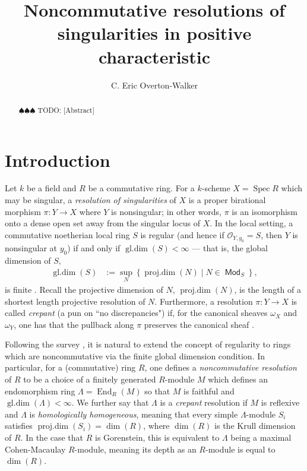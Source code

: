 \documentclass{amsart}
\title{Noncommutative resolutions of singularities in positive characteristic}
\author{C. Eric Overton-Walker}
\theoremstyle{definition}
\DeclareMathOperator{\Spec}{\operatorname{Spec}}
\DeclareMathOperator{\gldim}{\operatorname{gl.dim}}
\DeclareMathOperator{\projdim}{\operatorname{proj.dim}}
\DeclareMathOperator{\End}{\operatorname{End}}
\DeclareMathOperator{\Mod}{\mathsf{Mod}}
\newcommand{\todo}[1]{{\color{teal} \sf $\spadesuit\spadesuit\spadesuit$ TODO: [#1]}}
\begin{document}
\begin{abstract}
\todo{Abstract}
\end{abstract}

\maketitle

\section{Introduction}

Let $k$ be a field and $R$ be a commutative ring. For a $k$-scheme $X=\Spec R$ which may be singular, a \emph{resolution of singularities} of $X$ is a proper birational morphism $\pi\colon Y\to X$ where $Y$ is nonsingular; in other words, $\pi$ is an isomorphism onto a dense open set away from the singular locus of $X$. In the local setting, a commutative noetherian local ring $S$ is regular (and hence if $\mathcal{O}_{Y,y_{0}}=S$, then $Y$ is nonsingular at $y_{0}$) if and only if $\gldim(S)<\infty$ --- that is, the global dimension of $S$,
\begin{align*}
\gldim(S)&:=\sup_{N}\left\{\projdim(N)\mid N\in\Mod_{S}\right\},
\end{align*}
is finite \cite[Thm.\ ~4.4.16]{Wei94}. Recall the projective dimension of $N$, $\projdim(N)$, is the length of a shortest length projective resolution of $N$. Furthermore, a resolution $\pi\colon Y\to X$ is called \emph{crepant} (a pun on ``no discrepancies") if, for the canonical sheaves $\omega_{X}$ and $\omega_{Y}$, one has that the pullback along $\pi$ preserves the canonical sheaf \cite[(0.2)]{Rei83}.

\bigbreak

Following the survey \cite[\S K]{Leu12}, it is natural to extend the concept of regularity to rings which are noncommutative via the finite global dimension condition. In particular, for a (commutative) ring $R$, one defines a \emph{noncommutative resolution} of $R$ to be a choice of a finitely generated $R$-module $M$ which defines an endomorphism ring $\Lambda=\End_{R}(M)$ so that $M$ is faithful and $\gldim(\Lambda)<\infty$. We further say that $\Lambda$ is a \emph{crepant} resolution if $M$ is reflexive and $\Lambda$ is \emph{homologically homogeneous}, meaning that every simple $\Lambda$-module $S_{i}$ satisfies $\projdim(S_{i})=\dim(R)$, where $\dim(R)$ is the Krull dimension of $R$. In the case that $R$ is Gorenstein, this is equivalent to $\Lambda$ being a maximal Cohen-Macaulay $R$-module, meaning its depth as an $R$-module is equal to $\dim(R)$.
\end{document}
